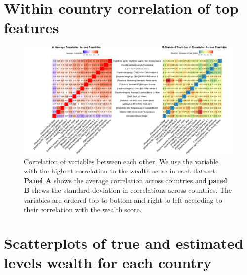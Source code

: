 \documentclass{article}
\begin{document}
\newpage
\section{Within country correlation of top features}
\label{si:within_cor_top_features}

\begin{figure}[H]
    \centering
    \includegraphics[width=1\textwidth]{figures/cor_between_vars.png}
    \caption{Correlation of variables between each other. We use the variable with the highest correlation to the wealth score in each dataset. {\bf Panel A} shows the average correlation across countries and {\bf panel B} shows the standard deviation in correlations across countries. The variables are ordered top to bottom and right to left according to their correlation with the wealth score.}
     \label{fig:cor_between_vars}
\end{figure}

\newpage
\section{Scatterplots of true and estimated levels wealth for each country}
\label{si:scatter_levels}
\end{document}
